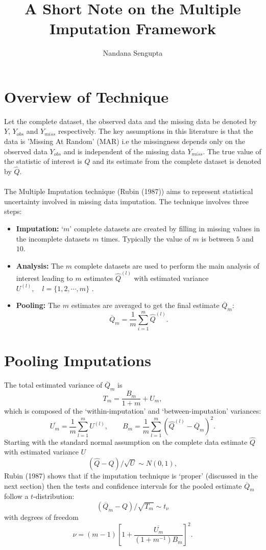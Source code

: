 \documentclass[11pt]{article} %
\begin{document}
\title{A Short Note on the Multiple Imputation Framework}
\author{Nandana Sengupta}

\maketitle
\noindent


\section{Overview of Technique}

Let the complete dataset, the observed data and the missing data be denoted by $Y$, $Y_{obs}$ and $Y_{miss}$ respectively. The key assumptions in this literature is that the data is 'Missing At Random' (MAR) i.e the missingness depends only on the observed data $Y_{obs}$ and is independent of the missing data $Y_{miss}$. The true value of the statistic of interest is $Q$ and its estimate from the complete dataset is denoted by $\widehat{Q}$.
\\\\
The Multiple Imputation technique (Rubin (1987)) aims to represent statistical uncertainty involved in missing data imputation. The technique involves three steps:
\begin{itemize}
\item \textbf{Imputation:} `$m$' complete datasets are created by filling in missing values in the incomplete datasets $m$ times. Typically the value of $m$ is between $5$ and $10$. 
\item \textbf{Analysis:} The $m$ complete datasets are used to perform the main analysis of interest leading to $m$ estimates $\widehat{Q}^{(l)}$ with estimated variance $U^{(l)}, \quad l = \{1, 2, \cdots , m\}$ .
\item \textbf{Pooling:} The $m$ estimates are averaged to get the final estimate $\overline{Q}_m$:
$$ \overline{Q}_m = \frac{1}{m}\sum_{i=1}^{m} \widehat{Q}^{(l)} . $$
\end{itemize}  

\section{Pooling Imputations}
\noindent The total estimated variance of $\overline{Q}_m$ is
$$ T_m = \frac{B_m}{1+m}  + U_m, $$ 
which is composed of the `within-imputation' and  `between-imputation' variances:
$$ \overline{U_m} = \frac{1}{m}\sum_{l=1}^{m} U^{(l)}, \qquad  B_m =  \frac{1}{m}\sum_{l=1}^{m} \left(\widehat{Q}^{(l)} - \overline{Q}_m\right)^2 .$$
Starting with the standard normal assumption on the complete data estimate $\widehat{Q}$ with estimated variance $U$
$$
(\widehat{Q} - Q)/ \sqrt{U} \sim N(0,1) , 
$$
Rubin (1987) shows that if the imputation technique is `proper' (discussed in the next section) then the tests and confidence intervals for the pooled estimate $\overline{Q}_m$ follow a $t$-distribution: 
$$
(\overline{Q}_m - Q)/ \sqrt{T_m} \sim t_{\nu}$$
with degrees of freedom
$$\nu = (m-1) \left[ 1 + \frac{\overline{U_m}}{(1+m^{-1})B_m}\right]^2.
$$
\end{document}
